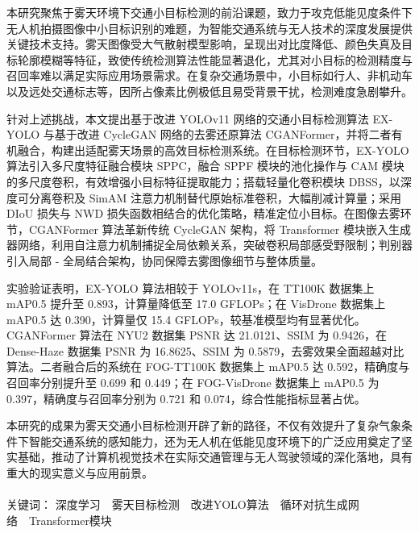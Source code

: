 \begin{cnabstract}

本研究聚焦于雾天环境下交通小目标检测的前沿课题，致力于攻克低能见度条件下无人机拍摄图像中小目标识别的难题，为智能交通系统与无人技术的深度发展提供关键技术支持。雾天图像受大气散射模型影响，呈现出对比度降低、颜色失真及目标轮廓模糊等特征，致使传统检测算法性能显著退化，尤其对小目标的检测精度与召回率难以满足实际应用场景需求。在复杂交通场景中，小目标如行人、非机动车以及远处交通标志等，因所占像素比例极低且易受背景干扰，检测难度急剧攀升。

针对上述挑战，本文提出基于改进 YOLOv11 网络的交通小目标检测算法 EX-YOLO 与基于改进 CycleGAN 网络的去雾还原算法 CGANFormer，并将二者有机融合，构建出适配雾天场景的高效目标检测系统。在目标检测环节，EX-YOLO 算法引入多尺度特征融合模块 SPPC，融合 SPPF 模块的池化操作与 CAM 模块的多尺度卷积，有效增强小目标特征提取能力；搭载轻量化卷积模块 DBSS，以深度可分离卷积及 SimAM 注意力机制替代原始标准卷积，大幅削减计算量；采用 DIoU 损失与 NWD 损失函数相结合的优化策略，精准定位小目标。在图像去雾环节，CGANFormer 算法革新传统 CycleGAN 架构，将 Transformer 模块嵌入生成器网络，利用自注意力机制捕捉全局依赖关系，突破卷积局部感受野限制；判别器引入局部 - 全局结合架构，协同保障去雾图像细节与整体质量。

实验验证表明，EX-YOLO 算法相较于 YOLOv11s，在 TT100K 数据集上 mAP0.5 提升至 0.893，计算量降低至 17.0 GFLOPs；在 VisDrone 数据集上 mAP0.5 达 0.390，计算量仅 15.4 GFLOPs，较基准模型均有显著优化。CGANFormer 算法在 NYU2 数据集 PSNR 达 21.0121、SSIM 为 0.9426，在 Dense-Haze 数据集 PSNR 为 16.8625、SSIM 为 0.5879，去雾效果全面超越对比算法。二者融合后的系统在 FOG-TT100K 数据集上 mAP0.5 达 0.592，精确度与召回率分别提升至 0.699 和 0.449；在 FOG-VisDrone 数据集上 mAP0.5 为 0.397，精确度与召回率分别为 0.721 和 0.074，综合性能指标显著占优。

本研究的成果为雾天交通小目标检测开辟了新的路径，不仅有效提升了复杂气象条件下智能交通系统的感知能力，还为无人机在低能见度环境下的广泛应用奠定了坚实基础，推动了计算机视觉技术在实际交通管理与无人驾驶领域的深化落地，具有重大的现实意义与应用前景。
\\
\\
\heiti 关键词：
\songti 深度学习\ \ 雾天目标检测\ \ 改进YOLO算法\ \ 循环对抗生成网络\ \ Transformer模块

\end{cnabstract}
\pagebreak


